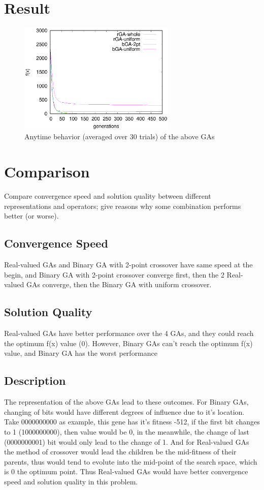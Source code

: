 ﻿\documentclass[conference]{IEEEtran}
\begin{document}
\begin{CJK}{UTF8}{bsmi}
\section{Result}

\begin{figure}[htbp]
\centerline{\includegraphics[width=7.5cm]{fig/cmp4GA/4GAs.eps}}
\caption{Anytime behavior (averaged over 30 trials) of the above GAs}
\label{fig}
\end{figure}

\section{Comparison}
Compare convergence speed and solution quality between different representations and operators; give reasons why some combination performs better (or worse).

\subsection{Convergence Speed}
Real-valued GAs and Binary GA with 2-point crossover have same speed at the begin, and Binary GA with 2-point crossover converge first, then the 2 Real-valued GAs converge, then the Binary GA with uniform crossover.

\subsection{Solution Quality}
Real-valued GAs have better performance over the 4 GAs, and they could reach the optimum f(x) value (0). However, Binary GAs can't reach the optimum f(x) value, and Binary GA has the worst performance

\subsection{Description}
The representation of the above GAs lead to these outcomes. For Binary GAs, changing of bits would have different degrees of influence due to it's location. Take 0000000000 as example, this gene has it's fitness -512, if the first bit changes to 1 (1000000000), then value would be 0, in the meanwhile, the change of last (0000000001) bit would only lead to the change of 1. And for Real-valued GAs the method of crossover would lead the children be the mid-fitness of their parents, thus would tend to evolute into the mid-point of the search space, which is 0 the optimum point. Thus Real-valued GAs would have better convergence speed and solution quality in this problem.


\end{CJK}
\end{document}
